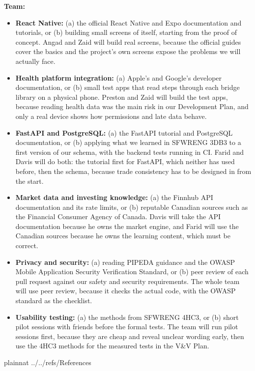 \documentclass[12pt]{article}
\begin{document}
\textbf{Team:}
\begin{itemize}
  \item \textbf{React Native:} (a) the official React Native and Expo
  documentation and tutorials, or (b) building small screens of \progname{}
  itself, starting from the proof of concept. Angad and Zaid will build real
  screens, because the official guides cover the basics and the project's own
  screens expose the problems we will actually face.
  \item \textbf{Health platform integration:} (a) Apple's and Google's
  developer documentation, or (b) small test apps that read steps through each
  bridge library on a physical phone. Preston and Zaid will build the test
  apps, because reading health data was the main risk in our Development Plan,
  and only a real device shows how permissions and late data behave.
  \item \textbf{FastAPI and PostgreSQL:} (a) the FastAPI tutorial and
  PostgreSQL documentation, or (b) applying what we learned in SFWRENG 3DB3 to
  a first version of our schema, with the backend tests running in CI. Farid
  and Davis will do both: the tutorial first for FastAPI, which neither has
  used before, then the schema, because trade consistency has to be designed
  in from the start.
  \item \textbf{Market data and investing knowledge:} (a) the Finnhub API
  documentation and its rate limits, or (b) reputable Canadian sources such as
  the Financial Consumer Agency of Canada. Davis will take the API
  documentation because he owns the market engine, and Farid will use the
  Canadian sources because he owns the learning content, which must be
  correct.
  \item \textbf{Privacy and security:} (a) reading PIPEDA guidance and the OWASP
  Mobile Application Security Verification Standard, or (b) peer review of
  each pull request against our safety and security requirements. The whole
  team will use peer review, because it checks the actual code, with the OWASP
  standard as the checklist.
  \item \textbf{Usability testing:} (a) the methods from SFWRENG 4HC3, or (b)
  short pilot sessions with friends before the formal tests. The team will run
  pilot sessions first, because they are cheap and reveal unclear wording
  early, then use the 4HC3 methods for the measured tests in the V\&V Plan.
\end{itemize}
\newpage

 {plainnat}
 {../../refs/References}

\newpage
\end{document}
